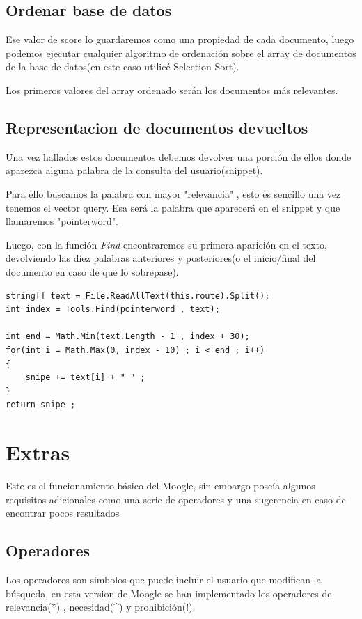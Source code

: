 \documentclass{article}
\begin{document}
\subsection{Ordenar base de datos}
Ese valor de score lo guardaremos como una propiedad de cada documento, luego podemos ejecutar cualquier algoritmo de ordenación
sobre el array de documentos de la base de datos(en este caso utilicé Selection Sort).

Los primeros valores del array ordenado serán los documentos más relevantes.

\subsection{Representacion de documentos devueltos}
Una vez hallados estos documentos debemos devolver una porción de ellos donde aparezca alguna palabra de la consulta del usuario(snippet).

Para ello buscamos la palabra con mayor "relevancia" , esto es sencillo una vez tenemos el vector query. Esa será la palabra que 
aparecerá en el snippet y que llamaremos "pointerword".

Luego, con la función \textit{Find} encontraremos su primera aparición en el texto, devolviendo las diez palabras anteriores y posteriores(o el inicio/final del documento
en caso de que lo sobrepase).\\[5pt]


\begin{lstlisting}
string[] text = File.ReadAllText(this.route).Split();
int index = Tools.Find(pointerword , text);

int end = Math.Min(text.Length - 1 , index + 30);
for(int i = Math.Max(0, index - 10) ; i < end ; i++)
{
    snipe += text[i] + " " ;
}
return snipe ;

\end{lstlisting}


\section{Extras}
Este es el funcionamiento básico del Moogle, sin embargo poseía algunos requisitos adicionales como una serie de operadores
y una sugerencia en caso de encontrar pocos resultados

\subsection{Operadores}
Los operadores son simbolos que puede incluir el usuario que modifican la búsqueda, en esta version de Moogle se han implementado los operadores de
relevancia(*) , necesidad(\textasciicircum) y prohibición(!).
\end{document}
